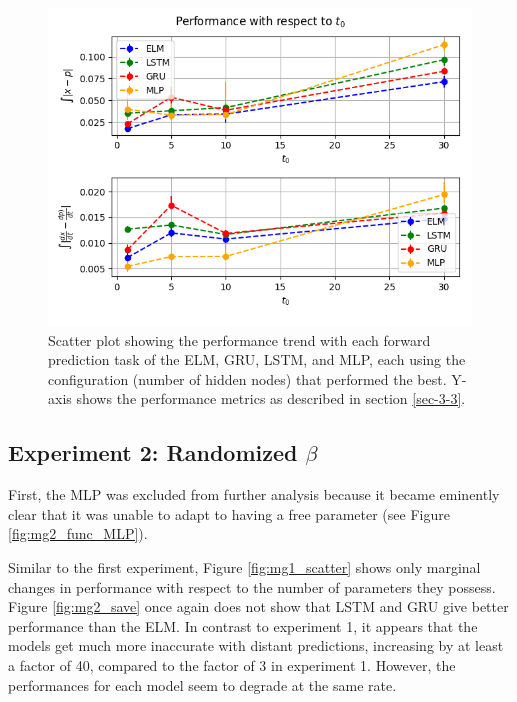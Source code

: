 \documentclass[11pt]{article}
\begin{document}
  \begin{figure}
    \begin{center}
   \includegraphics[width=.96\textwidth]{figures/mg1_save.png}       
    \caption{Scatter plot showing the performance trend with each forward prediction task of the ELM, GRU, LSTM, and MLP, each using the configuration (number of hidden nodes) that performed the best. Y-axis shows the performance metrics as described in section \ref{sec-3-3}.}
    \label{fig:mg1_save}
    \end{center}
  \end{figure}

  \subsection {Experiment 2: Randomized $\beta$}

  First, the MLP was excluded from further analysis because it became eminently clear that it
  was unable to adapt to having a free parameter (see Figure
  \ref{fig:mg2_func_MLP}).


  Similar to the first experiment,
  Figure \ref{fig:mg1_scatter} shows only marginal changes in performance with
  respect to the number of parameters they possess. Figure \ref{fig:mg2_save} once again  does not show that LSTM and GRU give better performance
  than the ELM. In contrast to experiment 1, it appears that
  the models get much more inaccurate with distant
  predictions, increasing by at least a factor of 40, compared to the factor of 3 in experiment 1. However, the performances for each model seem to
  degrade at the same rate.
\end{document}
